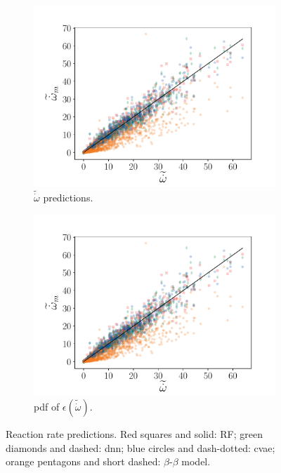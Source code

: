 \documentclass[review]{elsarticle}
\newcommand{\wt}[1]{\widetilde{#1}}
\begin{document}
\begin{figure}[!tbp]%
  \centering%
  \begin{subfigure}[t]{0.48\textwidth}%
    \includegraphics[page=1,width=\textwidth, trim=0.5cm 0cm 1.5cm 1.3cm, clip=true]{./figs/convolution_dice_0004.pdf}%
    \caption{$\wt{\dot{\omega}}$ predictions.}\label{fig:convolution_scatter}%
  \end{subfigure}\hfill%
  \begin{subfigure}[t]{0.48\textwidth}%
    \includegraphics[page=2,width=\textwidth, trim=0.5cm 0cm 1.5cm 1.3cm, clip=true]{./figs/convolution_dice_0004.pdf}%
    \caption{\gls{pdf} of $\epsilon(\wt{\dot{\omega}})$.}\label{fig:convolution_pdf}%
  \end{subfigure}%
  \caption{Reaction rate predictions. Red squares and solid: RF; green diamonds and dashed: \gls{dnn}; blue circles and dash-dotted: \gls{cvae}; orange pentagons and short dashed: $\beta$-$\beta$ model.}\label{fig:convolution}%
\end{figure}%
\end{document}
